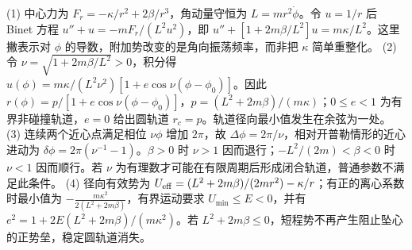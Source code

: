 (1) 中心力为 \(F_r=-\kappa/r^2+2\beta/r^3\)，角动量守恒为 \(L=mr^2\dot\phi\)。令 \(u=1/r\) 后 Binet 方程 \(u''+u=-mF_r/(L^2u^2)\)，即 \(u''+[1+2m\beta/L^2]u=m\kappa/L^2\)。这里撇表示对 \(\phi\) 的导数，附加势改变的是角向振荡频率，而非把 \(\kappa\) 简单重整化。
(2) 令 \(\nu=\sqrt{1+2m\beta/L^2}>0\)，积分得 \(u(\phi)=m\kappa/(L^2\nu^2)[1+e\cos\nu(\phi-\phi_0)]\)。因此 \(r(\phi)=p/[1+e\cos\nu(\phi-\phi_0)]\)，\(p=(L^2+2m\beta)/(m\kappa)\)；\(0\le e<1\) 为有界非碰撞轨道，\(e=0\) 给出圆轨道 \(r_c=p\)。轨道径向最小值发生在余弦为一处。
(3) 连续两个近心点满足相位 \(\nu\phi\) 增加 \(2\pi\)，故 \(\Delta\phi=2\pi/\nu\)，相对开普勒情形的近心进动为 \(\delta\phi=2\pi(\nu^{-1}-1)\)。\(\beta>0\) 时 \(\nu>1\) 因而退行；\(-L^2/(2m)<\beta<0\) 时 \(\nu<1\) 因而顺行。若 \(\nu\) 为有理数才可能在有限周期后形成闭合轨道，普通参数不满足此条件。
(4) 径向有效势为 \(U_{\rm eff}=(L^2+2m\beta)/(2mr^2)-\kappa/r\)；有正的离心系数时最小值为 \(-\frac{m\kappa^2}{2(L^2+2m\beta)}\)，有界运动要求 \(U_{\min}\le E<0\)，并有 \(e^2=1+2E(L^2+2m\beta)/(m\kappa^2)\)。若 \(L^2+2m\beta\le0\)，短程势不再产生阻止坠心的正势垒，稳定圆轨道消失。

